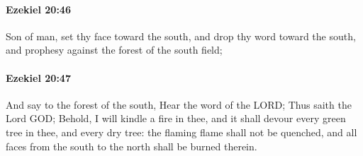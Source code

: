 		\paragraph{Ezekiel 20:46} %
			\label{EZEKIEL-20-46}

			Son of man, set thy face toward the south, and drop thy word toward the south, and prophesy against the forest of the south field;


		\paragraph{Ezekiel 20:47} %
			\label{EZEKIEL-20-47}

			And say to the forest of the south, Hear the word of the LORD; Thus saith the Lord GOD; Behold, I will kindle a fire in thee, and it shall devour every green tree in thee, and every dry tree: the flaming flame shall not be quenched, and all faces from the south to the north shall be burned therein.

